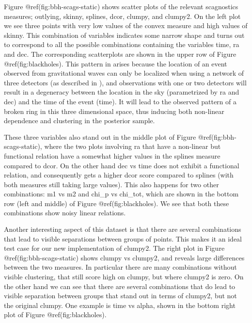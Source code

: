 Figure @ref(fig:bbh-scags-static) shows scatter plots of the relevant
scagnostics measures; outlying, skinny, splines, dcor, clumpy, and
clumpy2. On the left plot we see three points with very low values of
the convex measure and high values of skinny. This combination of
variables indicates some narrow shape and turns out to correspond to all
the possible combinations containing the variables time, ra and dec. The
corresponding scatterplots are shown in the upper row of Figure
@ref(fig:blackholes). This pattern in arises because the location of an
event observed from gravitational waves can only be localized when using
a network of three detectors (as described in \citet{gwtriang}), and
observations with one or two detectors will result in a degeneracy
between the location in the sky (parametrized by ra and dec) and the
time of the event (time). It will lead to the observed pattern of a
broken ring in this three dimensional space, thus inducing both
non-linear dependence and clustering in the posterior sample.

These three variables also stand out in the middle plot of Figure
@ref(fig:bbh-scags-static), where the two plots involving ra that have a
non-linear but functional relation have a somewhat higher values in the
splines measure compared to dcor. On the other hand dec vs time does not
exhibit a functional relation, and consequently gets a higher dcor score
compared to splines (with both measures still taking large values). This
also happens for two other combinations: m1 vs m2 and chi\_p vs
chi\_tot, which are shown in the bottom row (left and middle) of Figure
@ref(fig:blackholes). We see that both these combinations show noisy
linear relations.

Another interesting aspect of this dataset is that there are several
combinations that lead to visible separations between groups of points.
This makes it an ideal test case for our new implementation of clumpy2.
The right plot in Figure @ref(fig:bbh-scags-static) shows clumpy vs
clumpy2, and reveals large differences between the two measures. In
particular there are many combinations without visible clustering, that
still score high on clumpy, but where clumpy2 is zero. On the other hand
we can see that there are several combinations that do lead to visible
separation between groups that stand out in terms of clumpy2, but not
the original clumpy. One example is time vs alpha, shown in the bottom
right plot of Figure @ref(fig:blackholes).


